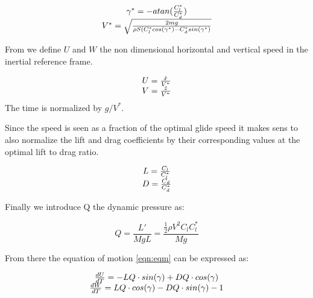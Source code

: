 \begin{equation}
	\begin{array}[c]{c}
		\gamma^*= - atan(\frac{C_l^*}{C_d^*}) \\
		V^* = \sqrt{\frac{2mg}{\rho S (C_l^* cos(\gamma^*) - C_d^* sin(\gamma^*)}}
	\end{array}
	\label{eqn:glide_speed}
\end{equation}

\par From we define $U$ and $W$ the non dimensional horizontal and vertical speed in the inertial reference frame.

\begin{equation}
	\begin{array}[c]{c}
		U = \frac{\dot{x}}{V^*} \\
		V= \frac{\dot{z}}{V^*}
	\end{array}
	\label{eqn:non_dim_speed}
\end{equation}
The time is normalized by $g / V^*$.

\par Since the speed is seen as a fraction of the optimal glide speed it makes sens to also normalize the lift and drag coefficients by their corresponding values at the optimal lift to drag ratio.

\begin{equation}
	\begin{array}[c]{c}
		L= \frac{C_l}{C_l^*} \\
		D= \frac{C_d}{C_d^*} 
	\end{array}
	\label{eqn:non_dim_coef}
\end{equation}

\par Finally we introduce Q the dynamic pressure as:

\begin{equation}
	Q = \frac{L'}{MgL} = \frac{\frac{1}{2} \rho V^2 C_l C_l^* }{Mg}
	\label{eqn:dynamic_pressure}
\end{equation}

\par From there the equation of motion \ref{eqn:eqm} can be expressed as:

\begin{equation}
\begin{array}[c]{c}
	\frac{dU}{dT}= -LQ \cdot sin(\gamma) + DQ \cdot cos(\gamma) \\ 
	\frac{dW}{dT}= LQ \cdot cos(\gamma) - DQ \cdot sin(\gamma) - 1
	\end{array}
	\label{eqn:non_dim_eqm}
\end{equation}

